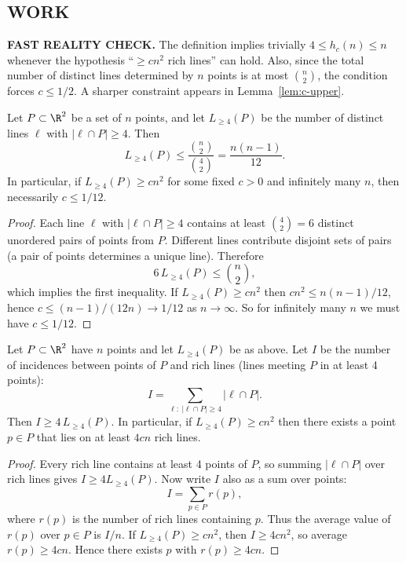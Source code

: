 \subsection*{WORK}
\noindent\textbf{FAST REALITY CHECK.}
The definition implies trivially $4\le h_c(n)\le n$ whenever the hypothesis ``$\ge cn^2$ rich lines'' can hold.
Also, since the total number of distinct lines determined by $n$ points is at most $\binom{n}{2}$, the condition forces $c\le 1/2$.
A sharper constraint appears in Lemma~\ref{lem:c-upper}.

\begin{lemma}\label{lem:c-upper}
Let $P\subset\R^2$ be a set of $n$ points, and let $L_{\ge 4}(P)$ be the number of distinct lines $\ell$ with $|\ell\cap P|\ge 4$.
Then
\[L_{\ge 4}(P)\le \frac{\binom{n}{2}}{\binom{4}{2}}=\frac{n(n-1)}{12}.
\]
In particular, if $L_{\ge 4}(P)\ge c n^2$ for some fixed $c>0$ and infinitely many $n$, then necessarily $c\le 1/12$.
\end{lemma}

\begin{proof}
Each line $\ell$ with $|\ell\cap P|\ge 4$ contains at least $\binom{4}{2}=6$ distinct unordered pairs of points from $P$.
Different lines contribute disjoint sets of pairs (a pair of points determines a unique line).
Therefore
\[6\,L_{\ge 4}(P)\le \binom{n}{2},
\]
which implies the first inequality.
If $L_{\ge 4}(P)\ge c n^2$ then $c n^2\le n(n-1)/12$, hence $c\le (n-1)/(12n)\to 1/12$ as $n\to\infty$.
So for infinitely many $n$ we must have $c\le 1/12$.
\end{proof}

\begin{proposition}
Let $P\subset\R^2$ have $n$ points and let $L_{\ge 4}(P)$ be as above.
Let $I$ be the number of incidences between points of $P$ and rich lines (lines meeting $P$ in at least 4 points):
\[I=\sum_{\ell:\ |\ell\cap P|\ge 4} |\ell\cap P|.
\]
Then $I\ge 4\,L_{\ge 4}(P)$.
In particular, if $L_{\ge 4}(P)\ge c n^2$ then there exists a point $p\in P$ that lies on at least $4c n$ rich lines.
\end{proposition}

\begin{proof}
Every rich line contains at least 4 points of $P$, so summing $|\ell\cap P|$ over rich lines gives $I\ge 4 L_{\ge 4}(P)$.
Now write $I$ also as a sum over points:
\[I=\sum_{p\in P} r(p),\]
where $r(p)$ is the number of rich lines containing $p$.
Thus the average value of $r(p)$ over $p\in P$ is $I/n$.
If $L_{\ge 4}(P)\ge c n^2$, then $I\ge 4c n^2$, so average $r(p)\ge 4c n$.
Hence there exists $p$ with $r(p)\ge 4c n$.
\end{proof}

